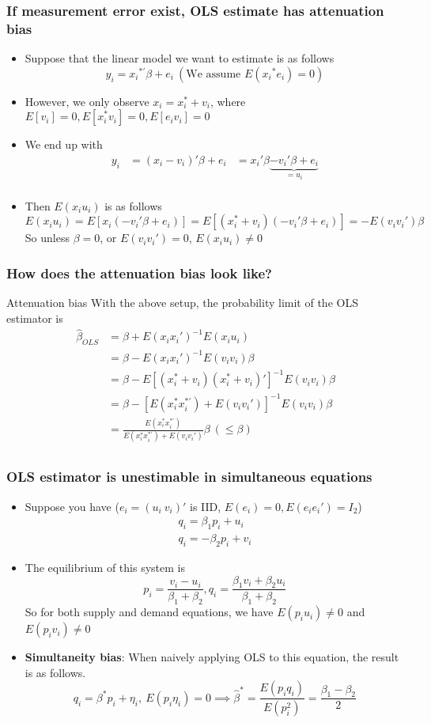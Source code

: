 \documentclass[aspectratio=169]{beamer}
\begin{document}
\begin{frame}
\frametitle{If measurement error exist, OLS estimate has attenuation bias}
\begin{itemize}
\item Suppose that the linear model we want to estimate is as follows
\[
y_i = {x_i}^{*'}\beta+e_i \ (\text{We assume }E({x_i}^{*}e_i)=0)
\]
\item However, we only observe $x_i=x_i^*+v_i$, where $E[v_i]=0, E[x_i^*v_i]=0, E[e_iv_i]=0$ 
\item We end up with
\[
\begin{aligned}
y_i &= (x_i-v_i)'\beta+e_i &=x_i'\beta \underbrace{-v_i'\beta+e_i}_{=u_i} \\
\end{aligned}
\]
\item Then $E(x_iu_i)$ is as follows
\[
E(x_iu_i)=E[x_i(-v_i'\beta+e_i)]=E[(x_i^{*}+v_i)(-v_i'\beta+e_i)]=-E(v_iv_i')\beta
\]
So unless $\beta=0$, or $E(v_iv_i')=0$, $E(x_iu_i)\neq0$
\end{itemize}
\end{frame}

\begin{frame}
\frametitle{How does the attenuation bias look like?}
\begin{block}{Attenuation bias}
With the above setup, the probability limit of the OLS estimator is
\[
\begin{aligned}
\hat{\beta}_{OLS} &=\beta+E(x_ix_i')^{-1}E(x_iu_i)\\
&=\beta-E(x_ix_i')^{-1}E(v_iv_i)\beta\\
&=\beta-E[(x_i^*+v_i)(x_i^*+v_i)']^{-1}E(v_iv_i)\beta\\
&=\beta-[E(x_i^*x_i^{*'})+E(v_iv_i')]^{-1}E(v_iv_i)\beta\\
&=\frac{E(x_i^*x_i^{*'})}{E(x_i^*x_i^{*'})+E(v_iv_i')}\beta \ (\leq\beta)\\
\end{aligned}
\]
\end{block}
\end{frame}

\begin{frame}
\frametitle{OLS estimator is unestimable in simultaneous equations}
\begin{itemize} 
\item Suppose you have ($e_i = (u_i \ v_i)'$ is IID, $E(e_i)=0, E(e_ie_i')=I_{2}$)
\begin{gather*}
q_i = \beta_1p_i+u_i \tag{Supply}\\
q_i = -\beta_2p_i+v_i \tag{Demand}
\end{gather*}
\item The equilibrium of this system is 
\[
p_i = \frac{v_i-u_i}{\beta_1+\beta_2}, q_i = \frac{\beta_1v_i + \beta_2u_i}{\beta_1+\beta_2}
\]
So for both supply and demand equations, we have $E(p_iu_i)\neq0$ and $E(p_iv_i)\neq0$
\item \textbf{Simultaneity bias}: When naively applying OLS to this equation, the result is as follows. 
\[
q_i=\beta^*p_i+\eta_i, \ E(p_i\eta_i)=0 \implies \hat{\beta}^*=\frac{E(p_iq_i)}{E(p_i^2)}=\frac{\beta_1-\beta_2}{2}
\]
\end{itemize}
\end{frame}
\end{document}

